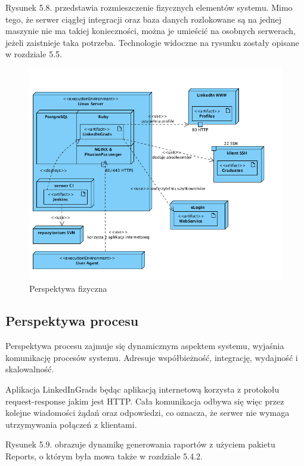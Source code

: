 Rysunek 5.8. przedstawia rozmieszczenie fizycznych elementów systemu. Mimo tego, że serwer ciągłej integracji oraz baza danych rozlokowane są na jednej maszynie nie ma takiej konieczności, można je umieścić na osobnych serwerach, jeżeli zaistnieje taka potrzeba. Technologie widoczne na rysunku zostały opisane w rozdziale 5.5.

\begin{figure}[H] 
\centering\includegraphics[width=15cm]{figures/image9}
\caption{Perspektywa fizyczna}\label{rys:use-case-diagram}
\end{figure}

\subsection{Perspektywa procesu}

Perspektywa procesu zajmuje się dynamicznym aspektem systemu, wyjaśnia komunikację procesów systemu. Adresuje współbieżność, integrację, wydajność i skalowalność.

Aplikacja LinkedInGrads będąc aplikacją internetową korzysta z protokołu request-response jakim jest HTTP. Cała komunikacja odbywa się więc przez kolejne wiadomości żądań oraz odpowiedzi, co oznacza, że serwer nie wymaga utrzymywania połączeń z klientami.

Rysunek 5.9. obrazuje dynamikę generowania raportów z użyciem pakietu Reports, o którym była mowa także w rozdziale 5.4.2.

